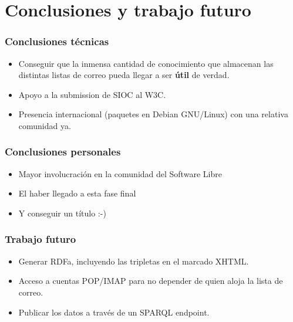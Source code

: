\documentclass[spanish,notes=hide]{beamer}
\begin{document}
\section{Conclusiones y trabajo futuro}
\frame
{
  \frametitle{Conclusiones técnicas}

  \begin{itemize}
   \item \begin{Large}Conseguir que la inmensa cantidad de conocimiento que almacenan
	 las distintas listas de correo pueda llegar a ser \textbf{útil} de 
         verdad.\end{Large}
   \vspace{1cm}
   \item \begin{Large}Apoyo a la submission de SIOC al W3C.\end{Large}
   \vspace{1cm}
   \item \begin{Large}Presencia internacional (paquetes en Debian GNU/Linux)
	 con una relativa comunidad ya.\end{Large}
  \end{itemize}

}
\frame
{
  \frametitle{Conclusiones personales}

  \begin{itemize}
   \item \begin{Large}Mayor involucración en la comunidad del Software Libre\end{Large}
   \vspace{1cm}
   \item \begin{Large}El haber llegado a esta fase final\end{Large}
   \vspace{1cm}
   \item \begin{Large}Y conseguir un título :-)\end{Large}
  \end{itemize}

}
\frame
{
  \frametitle{Trabajo futuro}

  \begin{itemize}
   \item \begin{Large}Generar RDFa, incluyendo las tripletas en el marcado XHTML.\end{Large}
   \vspace{1cm}
   \item \begin{Large}Acceso a cuentas POP/IMAP para no depender de quien aloja la lista de correo.\end{Large}
   \vspace{1cm}
   \item \begin{Large}Publicar los datos a través de un SPARQL endpoint.\end{Large}
  \end{itemize}
}
\end{document}
